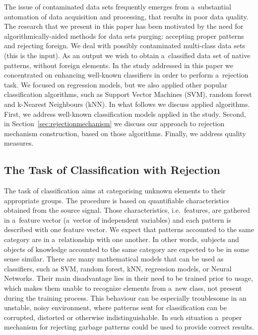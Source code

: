 \documentclass{llncs}
\begin{document}
The issue of contaminated data sets frequently emerges from a~substantial automation of data acquisition and processing, that results in poor data quality. The research that we present in this paper has been motivated by the need for algorithmically-aided methods for data sets purging: accepting proper patterns and rejecting foreign. We deal with possibly contaminated multi-class data sets (this is the input). As an output we wish to obtain a~classified data set of native patterns, without foreign elements. In the study addressed in this paper we concentrated on enhancing well-known classifiers in order to perform a~rejection task. We focused on regression models, but we also applied other popular classification algorithms, such as Support Vector Machines (SVM), random forest and k-Nearest Neighbours (kNN). In what follows we discuss applied algorithms. First, we address well-known classification models applied in the study. Second, in Section~\ref{sec:rejectionmechanism} we discuss our approach to rejection mechanism construction, based on those algorithms. Finally, we address quality measures.
\vspace{-3pt}

\subsection{The Task of Classification with Rejection}
	\label{sec:Known algorithms}

The task of classification aims at categorising unknown elements to their appropriate groups. The procedure is based on quantifiable characteristics obtained from the source signal. Those characteristics, i.e.~features, are gathered in a~feature vector (a~vector of independent variables) and each pattern is described with one feature vector. We expect that patterns accounted to the same category are in a~relationship with one another. In other words, subjects and objects of knowledge accounted to the same category are expected to be in some sense similar. There are many mathematical models that can be used as classifiers, such as SVM, random forest, kNN, regression models, or Neural Networks. Their main disadvantage lies in their need to be trained prior to usage, which makes them unable to recognize elements from a~new class, not present during the training process. This behaviour can be especially troublesome in an unstable, noisy environment, where patterns sent for classification can be corrupted, distorted or otherwise indistinguishable. In such situation a~proper mechanism for rejecting garbage patterns could be used to provide correct results. 
\vspace{-3pt}
\end{document}
